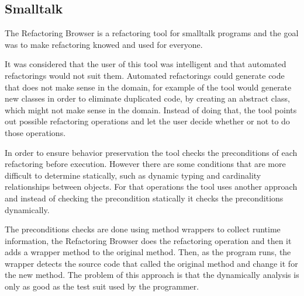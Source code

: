 
\subsection{Smalltalk}%

The Refactoring Browser \cite{roberts1997refactoring} is a refactoring tool for smalltalk programs and the goal was to make refactoring knowed and used for everyone.


It was considered that the user of this tool was intelligent and that automated refactorings would not suit them. 
Automated refactorings could generate code that does not make sense in the domain, for example of the tool would generate new classes in order to eliminate duplicated code, by creating an abstract class, which might not make sense in the domain. Instead of doing that, the tool points out possible refactoring operations and let the user decide whether or not to do those operations.

In order to ensure behavior preservation the tool checks the preconditions of each refactoring before execution. However there are some conditions that are more difficult to determine statically, such as dynamic typing and cardinality relationships between objects. For that operations the tool uses another approach and instead of checking the precondition statically it checks the preconditions dynamically. 

The preconditions checks are done using method wrappers to collect runtime information, the Refactoring Browser does the refactoring operation and then it adds a wrapper method to the original method. Then, as the program runs, the wrapper detects the source code that called the original method and change it for the new method.
The problem of this approach is that the dynamically analysis is only as good as the test suit used by the programmer.


